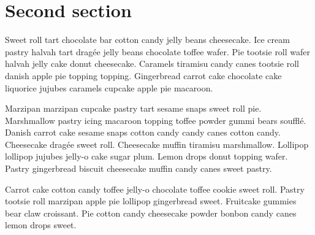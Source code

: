 \section{Second section}

Sweet roll tart chocolate bar cotton candy jelly beans cheesecake. Ice cream pastry halvah tart dragée jelly beans chocolate toffee wafer. Pie tootsie roll wafer halvah jelly cake donut cheesecake. Caramels tiramisu candy canes tootsie roll danish apple pie topping topping. Gingerbread carrot cake chocolate cake liquorice jujubes caramels cupcake apple pie macaroon.

Marzipan marzipan cupcake pastry tart sesame snaps sweet roll pie. Marshmallow pastry icing macaroon topping toffee powder gummi bears soufflé. Danish carrot cake sesame snaps cotton candy candy canes cotton candy. Cheesecake dragée sweet roll. Cheesecake muffin tiramisu marshmallow. Lollipop lollipop jujubes jelly-o cake sugar plum. Lemon drops donut topping wafer. Pastry gingerbread biscuit cheesecake muffin candy canes sweet pastry. 

Carrot cake cotton candy toffee jelly-o chocolate toffee cookie sweet roll. Pastry tootsie roll marzipan apple pie lollipop gingerbread sweet. Fruitcake gummies bear claw croissant. Pie cotton candy cheesecake powder bonbon candy canes lemon drops sweet.
